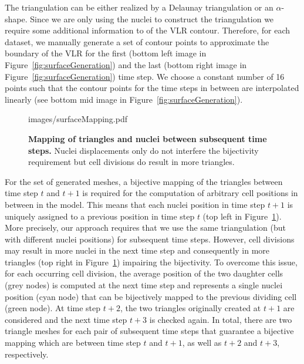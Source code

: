 \documentclass[11pt,a4paper, draft]{article}
\begin{document}
The triangulation can be either realized by a Delaunay triangulation or an $\alpha$-shape. Since we are only using the nuclei to construct the triangulation we require some additional information to of the VLR contour. Therefore, for each dataset, we manually generate a set of contour points to approximate the boundary of the VLR for the first (bottom left image in Figure~\ref{fig:surfaceGeneration}) and the last (bottom right image in Figure~\ref{fig:surfaceGeneration}) time step. We choose a constant number of 16 points such that the contour points for the time steps in between are interpolated linearly (see bottom mid image in Figure~\ref{fig:surfaceGeneration}).
%
\begin{figure}[htbp]
	\begin{center}
		\begin{overpic}[width=0.8\linewidth]{images/surfaceMapping.pdf}
		\end{overpic}
\caption[Mapping of triangles and nuclei between subsequent time steps.]
{
{\bf Mapping of triangles and nuclei between subsequent time steps.} Nuclei displacements only do not interfere the bijectivity requirement but cell divisions do result in more triangles.
}
	\label{fig:surfaceMapping}
	\end{center}
\end{figure}
%

For the set of generated meshes, a bijective mapping of the triangles between time step $t$ and $t+1$ is required for the computation of arbitrary cell positions in between in the model. This means that each nuclei position in time step $t+1$ is uniquely assigned to a previous position in time step $t$ (top left in Figure~\ref{fig:surfaceMapping}). More precisely, our approach requires that we use the same triangulation (but with different nuclei positions) for subsequent time steps. However, cell divisions may result in more nuclei in the next time step and consequently in more triangles (top right in Figure~\ref{fig:surfaceMapping}) impairing the bijectivity. To overcome this issue, for each occurring cell division, the average position of the two daughter cells (grey nodes) is computed at the next time step and represents a single nuclei position (cyan node) that can be bijectively mapped to the previous dividing cell (green node). At time step $t+2$, the two triangles originally created at $t+1$ are considered and the next time step $t+3$ is checked again. In total, there are two triangle meshes for each pair of subsequent time steps that guarantee a bijective mapping which are between time step $t$ and $t+1$, as well as $t+2$ and $t+3$, respectively.
\end{document}
